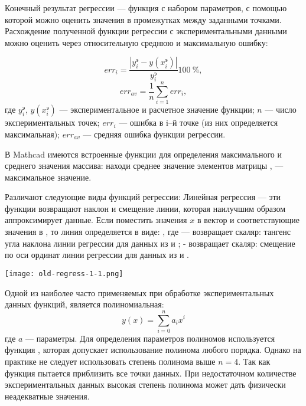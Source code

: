 Конечный результат регрессии --- функция с набором параметров, с помощью которой можно оценить значения в промежутках между заданными точками. Расхождение полученной функции регрессии с экспериментальными данными можно оценить через относительную среднюю и максимальную ошибку:

\begin{equation}
	err_i= \dfrac{\left| y_i^э - y(x^э_i) \right|}{y_i^э} 100\ \% ,
\end{equation}
\begin{equation}
	err_{av}=\dfrac{1}{n}\sum\limits_{i=1}^{n} err_i ,
\end{equation}
где $y_i^э$, $y(x_i^э)$ --- экспериментальное и расчетное значение функции; $n$ --- число экспериментальных точек; $err_i$ --- ошибка в i–й точке (из них определяется максимальная); $err_{av}$ --- средняя ошибка функции регрессии.

В Mathcad имеются встроенные функции для определения максимального и среднего значения массива: находи среднее значение элементов матрицы ,  --- максимальное значение.

Различают следующие виды функций регрессии:
Линейная регрессия  --- эти функции возвращают наклон и смещение линии, которая наилучшим образом аппроксимирует данные.
Если поместить значения $x$ в вектор  и соответствующие значения  в , то линия определяется в виде:
,
где  --- возвращает скаляр: тангенс угла наклона линии регрессии для данных из  и ;
 - возвращает скаляр: смещение по оси ординат линии регрессии для данных из  и .


\begin{center}
	\texttt{[image: old-regress-1-1.png]}
\end{center}


Одной из  наиболее часто применяемых при обработке экспериментальных данных функций, является полиномиальная:
\begin{equation}
	y(x)= \sum_{i=0}^{n} a_i x^i
\end{equation}
где $a$ --- параметры. Для определения параметров полиномов используется функция , которая допускает использование полинома любого порядка. Однако на практике не следует использовать степень полинома выше $n = 4$. Так как функция  пытается приблизить все точки данных. При недостаточном количестве экспериментальных данных высокая степень полинома может дать физически неадекватные значения.

